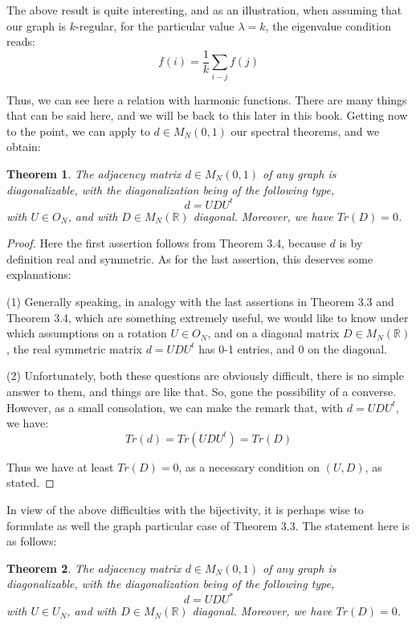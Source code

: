 \documentclass[12pt]{amsbook}
\newtheorem{theorem}{Theorem}[chapter]
\begin{document}
The above result is quite interesting, and as an illustration, when assuming that our graph is $k$-regular, for the particular value $\lambda=k$, the eigenvalue condition reads:
$$f(i)=\frac{1}{k}\sum_{i-j}f(j)$$ 

Thus, we can see here a relation with harmonic functions. There are many things that can be said here, and we will be back to this later in this book. Getting now to the point, we can apply to $d\in M_N(0,1)$ our spectral theorems, and we obtain:


\begin{theorem}
The adjacency matrix $d\in M_N(0,1)$ of any graph is diagonalizable, with the diagonalization being of the following type,
$$d=UDU^t$$
with $U\in O_N$, and with $D\in M_N(\mathbb R)$ diagonal. Moreover, we have $Tr(D)=0$.
\end{theorem}

\begin{proof}
Here the first assertion follows from Theorem 3.4, because $d$ is by definition real and symmetric. As for the last assertion, this deserves some explanations:

\medskip

(1) Generally speaking, in analogy with the last assertions in Theorem 3.3 and Theorem 3.4, which are something extremely useful, we would like to know under which assumptions on a rotation $U\in O_N$, and on a diagonal matrix $D\in M_N(\mathbb R)$, the real symmetric matrix $d=UDU^t$ has 0-1 entries, and 0 on the diagonal.

\medskip

(2) Unfortunately, both these questions are obviously difficult, there is no simple answer to them, and things are like that. So, gone the possibility of a converse. However, as a small consolation, we can make the remark that, with $d=UDU^t$, we have:
$$Tr(d)=Tr(UDU^t)=Tr(D)$$

Thus we have at least $Tr(D)=0$, as a necessary condition on $(U,D)$, as stated.
\end{proof}

In view of the above difficulties with the bijectivity, it is perhaps wise to formulate as well the graph particular case of Theorem 3.3. The statement here is as follows:

\begin{theorem}
The adjacency matrix $d\in M_N(0,1)$ of any graph is diagonalizable, with the diagonalization being of the following type,
$$d=UDU^*$$
with $U\in U_N$, and with $D\in M_N(\mathbb R)$ diagonal. Moreover, we have $Tr(D)=0$.
\end{theorem}
\end{document}
